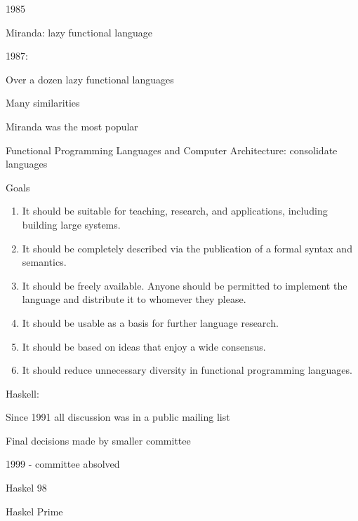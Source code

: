 \begin{frame}
1985

Miranda: lazy functional language
\end{frame}

\begin{frame}
1987:

Over a dozen lazy functional languages

Many similarities

Miranda was the most popular

Functional Programming Languages and Computer Architecture: consolidate languages
\end{frame}

\begin{frame}
Goals

\begin{enumerate}
\item It should be suitable for teaching, research, and applications,
  including building large systems.
\item It should be completely described via the publication of a
  formal syntax and semantics.
\item It should be freely available. Anyone should be permitted to
  implement the language and distribute it to whomever they please.
\item It should be usable as a basis for further language research.
\item It should be based on ideas that enjoy a wide consensus.
\item It should reduce unnecessary diversity in functional programming
  languages.
\end{enumerate}
\end{frame}

\begin{frame}
Haskell:

Since 1991 all discussion was in a public mailing list

Final decisions made by smaller committee

1999 - committee absolved

Haskel 98

Haskel Prime
\end{frame}

